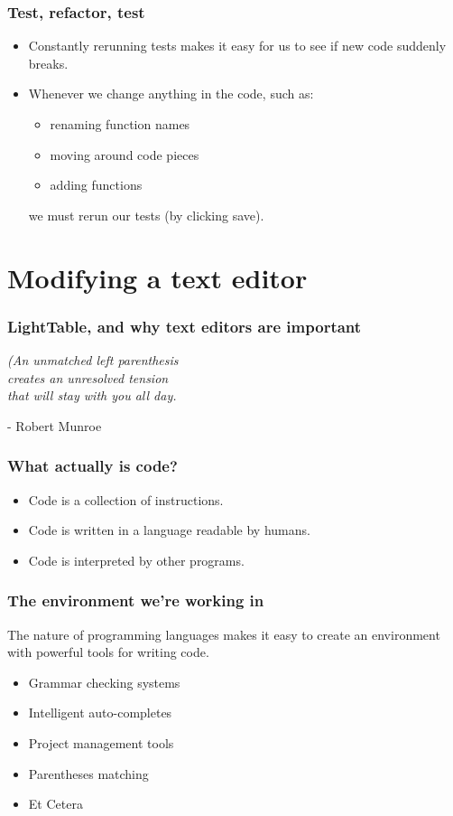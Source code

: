 \documentclass{beamer}
\begin{document}
\begin{frame}[fragile]
\frametitle{Test, refactor, test}
\begin{itemize}
\item Constantly rerunning tests makes it easy for us to see if new code suddenly breaks.
\item Whenever we change anything in the code, such as:
\begin{itemize}
\item renaming function names
\item moving around code pieces
\item adding functions
\end{itemize}
we must rerun our tests (by clicking save).
\end{itemize}		
\end{frame}

\section{Modifying a text editor}

\begin{frame}
\frametitle{LightTable, and why text editors are important}
	\begin{center}
	{\em (An unmatched left parenthesis\\ creates an unresolved tension\\ that will stay with you all day.}	

	\vspace*{2\baselineskip}
	- Robert Munroe
	\end{center}
\end{frame}

\begin{frame}
\frametitle{What actually is code?}
	\begin{itemize}
	\item Code is a collection of instructions.
	\item Code is written in a language readable by humans.
	\item Code is interpreted by other programs.
	\end{itemize}
\end{frame}

\begin{frame}
\frametitle{The environment we're working in}
	The nature of programming languages makes it easy to create an environment with powerful tools for writing code.
	{\em
	\begin{itemize}
	\item Grammar checking systems
	\item Intelligent auto-completes
	\item Project management tools
	\item Parentheses matching
	\item Et Cetera
	\end{itemize}
	}
\end{frame}
\end{document}
